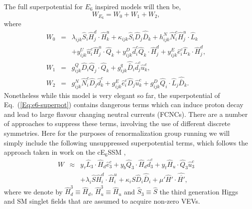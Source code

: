 \documentclass[preprint,amsmath,amssymb,aps,superscriptaddress,prd,
showpacs,floatfix,nofootinbib]{revtex4-1}
\newcommand{\be}{\begin{equation}}
\newcommand{\ee}{\end{equation}}
\newcommand{\ba}{\begin{eqnarray}}
\newcommand{\ea}{\end{eqnarray}}
\newcommand{\SuperField}[1]{\hat{#1}}
\begin{document}
The full superpotential for $E_6$ inspired models will then be,
\be
W_{E_6} = W_0 + W_1 + W_2 , \label{Eq:e6-superpot}
\ee
where
\begin{eqnarray}
W_0 &=& \lambda_{ijk} \hat{S}_i \hat{H}^d_{j} \cdot\hat{H}^u_{k} +
\kappa_{ijk} \hat{S}_i \hat{D}_j \hat{\overline{D}}_k + h^N_{ijk} \hat{N}^c_i
\hat{H}^u_{j} \cdot \hat{L}_k \nonumber \\
& & + y^U_{ijk} \hat{u}^c_i \hat{H}^u_{j} \cdot \hat{Q}_k + y^D_{ijk}
\hat{d}^c_i \hat{Q}_k \cdot \hat{H}^d_{j} + y^E_{ijk} \hat{e}^c_i \hat{L}_k
\cdot\hat{H}^d_{j} , \\
W_1 &=& g^Q_{ijk} \hat{D}_i \hat{Q}_j \cdot \hat{Q}_k + g^q_{ijk}
\hat{\bar{D}}_i \hat{d}^c_j \hat{u}^c_k , \\
W_2 &=& g^N_{ijk} \hat{N}^c_i \hat{D}_j \hat{d}^c_k + g^E_{ijk} \hat{e}^c_i
\hat{D}_j \hat{u}^c_k + g^D_{ijk} \hat{Q}_i \cdot \hat{L}_j \hat{\bar{D}}_k .
\label{Eq:e6-superpot-parts}
\end{eqnarray}
Nonetheless while this model is very elegant so far, the
superpotential of Eq.~(\ref{Eq:e6-superpot}) contains dangerous terms which
can induce proton decay and lead to large flavour changing neutral
currents (FCNCs).  There are a number of approaches to suppress these
terms, involving the use of different discrete symmetries.  Here for
the purposes of renormalization group running we will simply include
the following unsuppressed superpotential terms, which follows the
approach taken in work on the cE$_6$SSM \cite{Athron:2009ue, Athron:2009bs},
%
    \ba
    W &\approx& y_{\tau} \SuperField{L}_3 \cdot \SuperField{H}_d
      \SuperField{e}^c_3 + y_b \SuperField{Q}_3\cdot\SuperField{H}_d
      \SuperField{d}_3^c + y_t \SuperField{H}_u\cdot\SuperField{Q}_3
      \SuperField{u}_3^c\nonumber\\
    &&
    + \lambda_i \SuperField{S} \SuperField{H}_i^d
    \cdot \SuperField{H}_i^u  + \kappa_i \SuperField{S} \SuperField{D}_i
    \SuperField{\overline{D}}_i + \mu' \SuperField{H}'\cdot
    \SuperField{\overline{H'}},
    \ea
  \label{SuPot_RGE}
%
where we denote by $\SuperField{H}_d^3 \equiv \SuperField{H}_d$,
$\SuperField{H}_u^3 \equiv \SuperField{H}_u$ and $\SuperField{S}_3 \equiv
\SuperField{S}$ the third generation Higgs and SM singlet fields that are
assumed to acquire non-zero VEVs.
\end{document}
